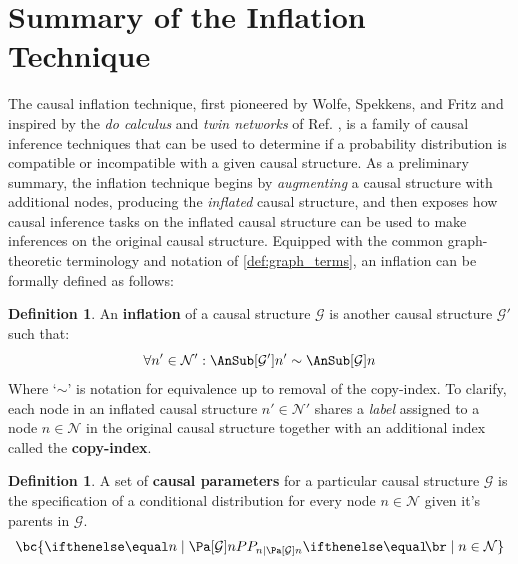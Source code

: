 \documentclass[aps, 10pt, english, twoside, pra, nofootinbib, longbibliography]{revtex4-1}
\theoremstyle{plain}
\theoremstyle{definition}
\newtheorem{definition}[theorem]{Definition}
\theoremstyle{remark}
\newcommand{\graph}{\mathcal{G}}
\newcommand{\nodes}{\mathcal{N}}
\newcommand{\term}[1]{\textcolor{Mahogany}{\textbf{#1}}}
\begin{document}
    \section{Summary of the Inflation Technique}
    The causal inflation technique, first pioneered by Wolfe, Spekkens, and Fritz \cite{Inflation} and inspired by the \textit{do calculus} and \textit{twin networks} of Ref. \cite{Pearl_2009}, is a family of causal inference techniques that can be used to determine if a probability distribution is compatible or incompatible with a given causal structure. As a preliminary summary, the inflation technique begins by \textit{augmenting} a causal structure with additional nodes, producing the \textit{inflated} causal structure, and then exposes how causal inference tasks on the inflated causal structure can be used to make inferences on the original causal structure. Equipped with the common graph-theoretic terminology and notation of \cref{def:graph_terms}, an inflation can be formally defined as follows:
    \begin{definition}
        An \term{inflation} of a causal structure $\graph$ is another causal structure $\graph'$ such that:
        \[ \forall n' \in \nodes' : \AnSub[\graph']{n'} \sim \AnSub[\graph]{n} \]
        Where `$\sim$' is notation for equivalence up to removal of the copy-index. To clarify, each node in an inflated causal structure $n' \in \nodes'$ shares a \textit{label} assigned to a node $n \in \nodes$ in the original causal structure together with an additional index called the \term{copy-index}.
    \end{definition}
    \begin{definition}
        A set of \term{causal parameters} for a particular causal structure $\graph$ is the specification of a conditional distribution for every node $n \in \nodes$ given it's parents in $\graph$.
        \[ \bc{\prob[n \mid \Pa[\graph]{n}] \mid n \in \nodes} \]
    \end{definition}
\end{document}
